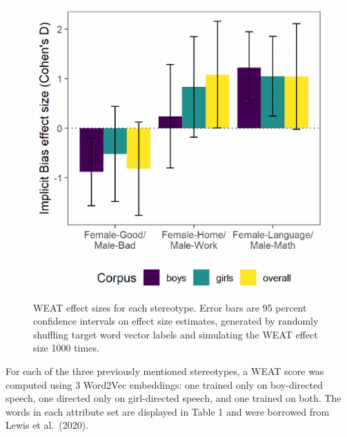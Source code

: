 \documentclass[10pt, letterpaper]{article}
\newenvironment{CodeChunk}{}{}
\begin{document}
\begin{CodeChunk}
\begin{figure}[h]

{\centering \includegraphics{figs/weatplot-1} 

}

\caption[WEAT effect sizes for each stereotype]{WEAT effect sizes for each stereotype. Error bars are 95 percent confidence intervals on effect size estimates, generated by randomly shuffling target word vector labels and simulating the WEAT effect size 1000 times.}\label{fig:weatplot}
\end{figure}
\end{CodeChunk}

For each of the three previously mentioned stereotypes, a WEAT score was
computed using 3 Word2Vec embeddings: one trained only on boy-directed
speech, one directed only on girl-directed speech, and one trained on
both. The words in each attribute set are displayed in Table 1 and were
borrowed from Lewis et al.~(2020).
\end{document}
